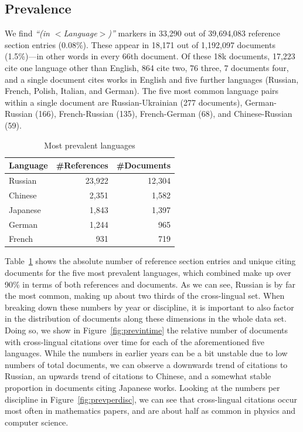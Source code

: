 \subsection{Prevalence}

We find \textit{``(in $<$Language$>$)''} markers in 33,290 out of 39,694,083 reference section entries (0.08\%). These appear in 18,171 out of 1,192,097 documents (1.5\%)---in other words in every 66th document. Of these 18k documents, 17,223 cite one language other than English, 864 cite two, 76 three, 7 documents four, and a single document cites works in English and five further languages (Russian, French, Polish, Italian, and German). The five most common language pairs within a single document are Russian-Ukrainian (277 documents), German-Russian (166), French-Russian (135), French-German (68), and Chinese-Russian (59).

\begin{table}
\caption{Most prevalent languages}
 \label{tab:prevlangs}
  \centering
  \begin{small}
 \begin{threeparttable}
 \begin{tabular}{lrr}
 \toprule
   Language & \#References & \#Documents \\
   \midrule
   Russian & 23,922 & 12,304 \\
   Chinese & 2,351 & 1,582 \\
   Japanese & 1,843 & 1,397 \\
   German & 1,244 & 965 \\
   French & 931 & 719 \\
   \bottomrule
 \end{tabular}
\end{threeparttable}
  \end{small}
\end{table}

Table~\ref{tab:prevlangs} shows the absolute number of reference section entries and unique citing documents for the five most prevalent languages, which combined make up over 90\% in terms of both references and documents. As we can see, Russian is by far the most common, making up about two thirds of the cross-lingual set. When breaking down these numbers by year or discipline, it is important to also factor in the distribution of documents along these dimensions in the whole data set. Doing so, we show in Figure~\ref{fig:previntime} the relative number of documents with cross-lingual citations over time for each of the aforementioned five languages. While the numbers in earlier years can be a bit unstable due to low numbers of total documents, we can observe a downwards trend of citations to Russian, an upwards trend of citations to Chinese, and a somewhat stable proportion in documents citing Japanese works. Looking at the numbers per discipline in Figure~\ref{fig:prevperdisc}, we can see that cross-lingual citations occur most often in mathematics papers, and are about half as common in physics and computer science.

